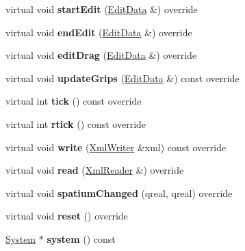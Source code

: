 \begin{DoxyCompactItemize}
virtual void {\bfseries start\+Edit} (\hyperlink{class_ms_1_1_edit_data}{Edit\+Data} \&) override
\item 
\mbox{\label{class_ms_1_1_beam_a56dbe9842a01dd07a66fa3384e5b491c}} 
virtual void {\bfseries end\+Edit} (\hyperlink{class_ms_1_1_edit_data}{Edit\+Data} \&) override
\item 
\mbox{\label{class_ms_1_1_beam_ac6d691bfdec409e162932ee8364d2ff8}} 
virtual void {\bfseries edit\+Drag} (\hyperlink{class_ms_1_1_edit_data}{Edit\+Data} \&) override
\item 
\mbox{\label{class_ms_1_1_beam_a903a8acfed3c22e3768f8ad853c41e02}} 
virtual void {\bfseries update\+Grips} (\hyperlink{class_ms_1_1_edit_data}{Edit\+Data} \&) const override
\item 
\mbox{\label{class_ms_1_1_beam_ac195e07258d791d7cd15509653191f6d}} 
virtual int {\bfseries tick} () const override
\item 
\mbox{\label{class_ms_1_1_beam_a9d92de06adffc19c783327526784a0a8}} 
virtual int {\bfseries rtick} () const override
\item 
\mbox{\label{class_ms_1_1_beam_a1796cd4bb9cec766f47277a539b8c945}} 
virtual void {\bfseries write} (\hyperlink{class_ms_1_1_xml_writer}{Xml\+Writer} \&xml) const override
\item 
\mbox{\label{class_ms_1_1_beam_a63d38650509051fe11fede0e3c8209ff}} 
virtual void {\bfseries read} (\hyperlink{class_ms_1_1_xml_reader}{Xml\+Reader} \&) override
\item 
\mbox{\label{class_ms_1_1_beam_a8c7abf4d53dbb1fc18d497da7c2a6d53}} 
virtual void {\bfseries spatium\+Changed} (qreal, qreal) override
\item 
\mbox{\label{class_ms_1_1_beam_a08909dcf2eef057f31f1363523d3554a}} 
virtual void {\bfseries reset} () override
\item 
\mbox{\label{class_ms_1_1_beam_aa0e67be0b5a2b752f41e8633eeef6118}} 
\hyperlink{class_ms_1_1_system}{System} $\ast$ {\bfseries system} () const

\end{DoxyCompactItemize}
